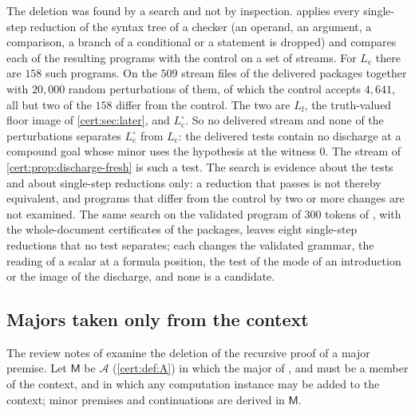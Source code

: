 The deletion was found by a search and not by inspection.
 applies every single-step reduction of the syntax tree of
a checker (an operand, an argument, a comparison, a branch of a conditional or
a statement is dropped) and compares each of the resulting programs with the
control on a set of streams. For $L_{\mathrm c}$ there are $158$ such
programs. On the $509$ stream files of the delivered packages together with
$20{,}000$ random perturbations of them, of which the control accepts
$4{,}641$, all but two of the $158$ differ from the control. The two are
$L_{\mathrm f}$, the truth-valued floor image of \cref{cert:sec:later}, and
$L^{\circ}_{\mathrm c}$. So no delivered stream and none of the perturbations
separates $L^{\circ}_{\mathrm c}$ from $L_{\mathrm c}$: the delivered tests
contain no discharge at a compound goal whose minor uses the hypothesis at
the witness $0$. The stream of \cref{cert:prop:discharge-fresh} is such a
test. The search is evidence about the tests and about single-step
reductions only: a reduction that passes is not thereby equivalent, and
programs that differ from the control by two or more changes are not
examined. The same search on the validated program of $300$ tokens of
, with the whole-document certificates of the packages,
leaves eight single-step reductions that no test separates; each changes the
validated grammar, the reading of a scalar at a formula position, the test of
the mode of an introduction or the image of the discharge, and none is a
candidate.

\subsection{Majors taken only from the context}\label{cert:sec:membership-major}

The review notes of  examine the deletion of the
recursive proof of a major premise. Let $\mathsf M$ be $\mathcal A$
(\cref{cert:def:A}) in which the major of ,  and
 must be a member of the context, and in which any computation
instance may be added to the context; minor premises and continuations are
derived in $\mathsf M$.

